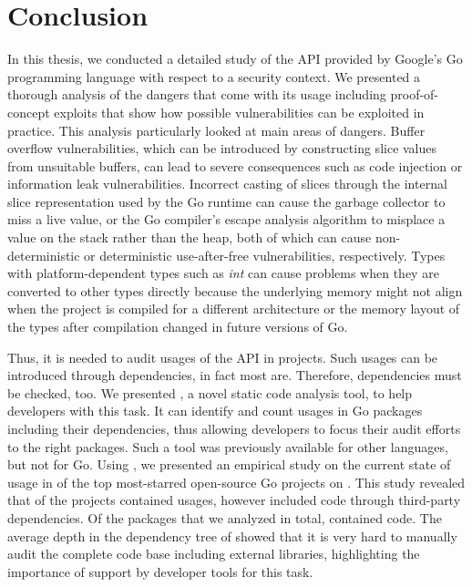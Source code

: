 
\chapter{Conclusion}\label{ch:conclusion}

In this thesis, we conducted a detailed study of the \unsafe{} \acrshort{API} provided by Google's Go programming
language with respect to a security context.
We presented a thorough analysis of the dangers that come with its usage including proof-of-concept exploits that show
how possible vulnerabilities can be exploited in practice.
This analysis particularly looked at  main areas of dangers.
Buffer overflow vulnerabilities, which can be introduced by constructing slice values from unsuitable buffers, can lead
to severe consequences such as code injection or information leak vulnerabilities.
Incorrect casting of slices through the internal slice representation used by the Go runtime can cause the garbage
collector to miss a live value, or the Go compiler's escape analysis algorithm to misplace a value on the stack rather
than the heap, both of which can cause non-deterministic or deterministic use-after-free vulnerabilities, respectively.
Types with platform-dependent types such as \textit{int} can cause problems when they are converted to other types
directly because the underlying memory might not align when the project is compiled for a different architecture or
the memory layout of the types after compilation changed in future versions of Go.

Thus, it is needed to audit usages of the \unsafe{} API in projects.
Such usages can be introduced through dependencies, in fact most are.
Therefore, dependencies must be checked, too.
We presented \toolGeiger{}, a novel static code analysis tool, to help developers with this task.
It can identify and count \unsafe{} usages in Go packages including their dependencies, thus allowing developers to
focus their audit efforts to the right packages.
Such a tool was previously available for other languages, but not for Go.
Using \toolGeiger{}, we presented an empirical study on the current state of \unsafe{} usage in \projsAnalyzed{} of the
top \projsTotal{} most-starred open-source Go projects on \github{}.
This study revealed that \percentageUnsafeProjects{} of the projects contained \unsafe{} usages, however
\percentageUnsafeTransitiveWithDependencies{} included \unsafe{} code through third-party dependencies.
Of the \packagesAnalyzed{} packages that we analyzed in total, \percentageUnsafePackages{} contained \unsafe{} code.
The average depth in the dependency tree of \averageUnsafeImportDepth{} showed that it is very hard to manually audit
the complete code base including external libraries, highlighting the importance of support by developer tools for this
task.

